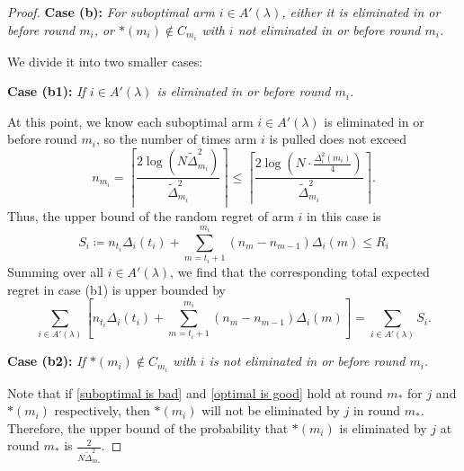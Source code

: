 \documentclass[
  12pt]{article}
\begin{document}
\begin{proof}
\textbf{Case (b):} \textit{ For suboptimal arm \( i \in A'(\lambda)\), either it is eliminated in or before round \( m_i \), or \( *(m_i) \notin C_{m_i} \) with $i$ not eliminated in or before round \( m_i \). }

We divide it into two smaller cases:

\textbf{Case (b1):}\textit{ If \( i \in A'(\lambda)\) is eliminated in or before round \( m_i \).  }

At this point, we know each suboptimal arm \( i \in A'(\lambda) \) is eliminated in or before round \( m_i \), so the number of times arm \( i \) is pulled does not exceed 
\[ n_{m_i} = \left\lceil \frac{2\log(N \tilde{\Delta}_{m_i}^2)}{\tilde{\Delta}_{m_i}^2} \right\rceil \leq \left\lceil \frac{2\log\left(N \cdot \frac{\Delta_i^2(m_i)}{4}\right)}{\tilde{\Delta}_{m_i}^2} \right\rceil .\]
Thus, the upper bound of the random regret of arm $i$ in this case is
\[S_i\coloneqq n_{t_i}\Delta_i(t_i) + \sum_{m = t_i + 1}^{m_i} (n_m - n_{m-1})\Delta_i(m) \leq R_i \] Summing over all $i\in A'(\lambda)$, we find that the corresponding total expected regret in case (b1) is upper bounded by 
\[\sum_{i \in A'(\lambda)} \left[ n_{t_i}\Delta_i(t_i) + \sum_{m = t_i + 1}^{m_i} (n_m - n_{m-1})\Delta_i(m) \right] =\sum_{i \in A'(\lambda)} S_i.\]

\textbf{Case (b2):}\textit{ If \( *(m_i) \notin C_{m_i} \) with $i$ is not eliminated in or before round \( m_i \). }  

Note that if \eqref{suboptimal is bad} and \eqref{optimal is good} hold at round \( m_* \) for $j$ and $*(m_i)$ respectively, then \( *(m_i) \) will not be eliminated by \( j \) in round $m_*$. Therefore, the upper bound of the probability that \( *(m_i) \) is eliminated by \( j \) at round \( m_* \) is \( \frac{2}{N \tilde{\Delta}_{m_*}^2} \). 


\end{proof}
\end{document}
